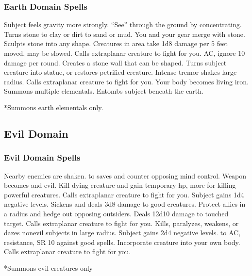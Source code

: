 \subsubsection{Earth Domain Spells}
\begin{spelllist}
   Subject feels gravity more strongly.
   ``See'' through the ground by concentrating.
  \spellhead[2]{}
   Turns stone to clay or dirt to sand or mud.
   You and your gear merge with stone.
   Sculpts stone into any shape.
   Creatures in area take 1d8 damage per 5 feet moved, may be slowed.
   Calls extraplanar creature to fight for you.
    AC, ignore 10 damage per round.
   Creates a stone wall that can be shaped.
   Turns subject creature into statue, or restores petrified creature.
   Intense tremor shakes large radius.
   Calls extraplanar creature to fight for you.
   Your body becomes living iron.
  \spellhead[8]{}
   Summons multiple elementals.
   Entombs subject beneath the earth.
\end{spelllist}
*Summons earth elementals only.

\subsection{Evil Domain}

\subsubsection{Evil Domain Spells}
\begin{spelllist}
   Nearby enemies are shaken.
    to saves and counter opposing mind control.
   Weapon becomes  and evil.
   Kill dying creature and gain temporary hp, more for killing powerful creatures.
  \spellhead[3]{}
  \spellhead[3]{}
   Calls extraplanar creature to fight for you.
   Subject gains 1d4 negative levels.
   Sickens and deals 3d8 damage to good creatures.
  \spellhead[5]{}
   Protect allies in a \areamed radius and hedge out opposing outsiders.
   Deals 12d10 damage to touched target.
   Calls extraplanar creature to fight for you.
   Kills, paralyzes, weakens, or dazes nonevil subjects in large radius.
  \spellhead[7]{}
   Subject gains 2d4 negative levels.
  \F {} to AC,  resistance, SR 10 against good spells.
   Incorporate creature into your own body.
   Calls extraplanar creature to fight for you.
\end{spelllist}
*Summons evil creatures only

